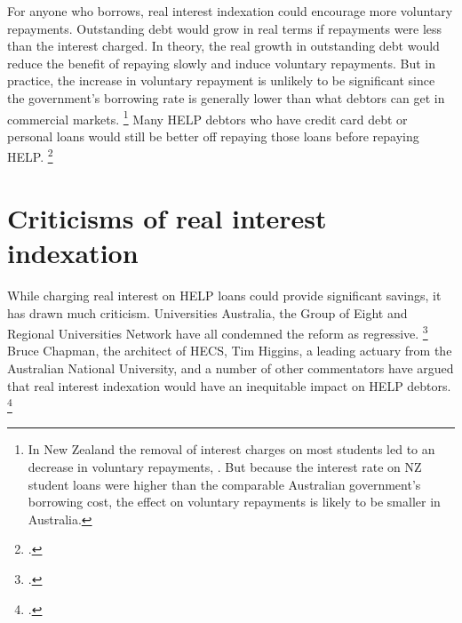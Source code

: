 \documentclass[embargoed]{grattan}
\begin{document}
For anyone who borrows, real interest indexation could encourage more voluntary repayments.
Outstanding debt would grow in real terms if repayments were less than the interest charged.
In theory, the real growth in outstanding debt would reduce the benefit of repaying slowly and induce voluntary repayments.
But in practice, the increase in voluntary repayment is unlikely to be significant since the government's borrowing rate is generally lower than what debtors can get in commercial markets.%
\footnote{In New Zealand the removal of interest charges on most students led to an decrease in voluntary repayments, \textcite[][34]{EducationNZ2013Studentloanscheme}.
But because the interest rate on NZ student loans were higher than the comparable Australian government's borrowing cost, the effect on voluntary repayments is likely to be smaller in Australia.} Many \gls{HELP} debtors who have credit card debt or personal loans would still be better off repaying those loans before repaying \gls{HELP}.%
\footcite{MoneySmart2016Payingyouruni}

\section{Criticisms of real interest indexation}\label{sec:criticisms-of-real-interest-indexation}

While charging real interest on \gls{HELP} loans could provide significant savings, it has drawn much criticism.
Universities Australia, the Group of Eight and Regional Universities Network have all condemned the reform as regressive.%
\footcites{Eight2015Go8submissionSenate}{Australia2015UniversitiesAustraliaSubmission}{RUN2014RUNGo8urge} 
Bruce Chapman, the architect of \gls{HECS}, Tim Higgins, a leading actuary from the Australian National University, and a number of other commentators have argued that real interest indexation would have an inequitable impact on \gls{HELP} debtors.%
\footcites{Chapman2014InquiryprovisionsHigher}{Koshy2014effect201415}{Kniest2014endpublichigher}{Struthers-2015-Getting-in-early-avoid-gender-stereotype}
\end{document}
